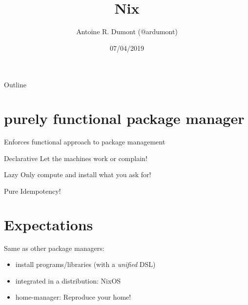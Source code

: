 \documentclass[smaller]{beamer}
\author{Antoine R. Dumont (@ardumont)}
\date{07/04/2019}
\title{Nix}
\begin{document}
\maketitle
\begin{frame}{Outline}
\tableofcontents
\end{frame}


\section{purely functional package manager}
\label{sec:org137326a}

Enforces functional approach to package management\\

\begin{block}{Declarative}
Let the machines work or complain!\\
\end{block}

\begin{block}{Lazy}
Only compute and install what you ask for!\\
\end{block}

\begin{block}{Pure}
Idempotency!\\
\end{block}

\section{Expectations}
\label{sec:orgc793fa8}

Same as other package managers:\\

\begin{itemize}
\item install programs/libraries (with a \emph{unified} DSL)\\

\item integrated in a distribution: NixOS\\

\item home-manager: Reproduce your home!\\
\end{itemize}
\end{document}
